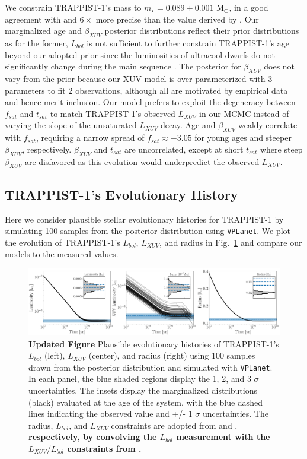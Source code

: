 \documentclass[twocolumn]{aastex62}
\newcommand{\xxx}[1]{{\textbf{#1}}}
\newcommand{\vplanet}[0]{\texttt{VPLanet}\xspace}
\begin{document}
We constrain TRAPPIST-1's mass to $m_{\star} = 0.089 \pm{0.001}$ M$_{\odot}$, in a good agreement with and $6\times$ more precise than the value derived by \citet{vanGrootel2018}. Our marginalized age and $\beta_{XUV}$ posterior distributions reflect their prior distributions as for the former, $L_{bol}$ is not sufficient to further constrain TRAPPIST-1's age beyond our adopted prior since the luminosities of ultracool dwarfs do not significantly change during the main sequence \citep{Baraffe2015}. The posterior for $\beta_{XUV}$ does not vary from the prior because our XUV model is over-parameterized with 3 parameters to fit 2 observations, although all are motivated by empirical data and hence merit inclusion. Our model prefers to exploit the degeneracy between $f_{sat}$ and $t_{sat}$ to match TRAPPIST-1's observed $L_{XUV}$ in our MCMC instead of varying the slope of the unsaturated $L_{XUV}$ decay. Age and $\beta_{XUV}$ weakly correlate with $f_{sat}$, requiring a narrow spread of $f_{sat} \approx -3.05$ for young ages and steeper $\beta_{XUV}$, respectively. $\beta_{XUV}$ and $t_{sat}$ are uncorrelated, except at short $t_{sat}$ where steep $\beta_{XUV}$ are disfavored as this evolution would underpredict the observed $L_{XUV}$.

\subsection{TRAPPIST-1's Evolutionary History}

Here we consider plausible stellar evolutionary histories for TRAPPIST-1 by simulating 100 samples from the posterior distribution using \vplanet. We plot the evolution of TRAPPIST-1's $L_{bol}$, $L_{XUV}$, and radius in Fig.~\ref{fig:evol} and compare our models to the measured values. 

\begin{figure}[t]
	\includegraphics[width=\textwidth]{../Analysis/Evol/trappist1Evol.pdf}
   \caption{\xxx{Updated Figure} Plausible evolutionary histories of TRAPPIST-1's $L_{bol}$ (left), $L_{XUV}$ (center), and radius (right) using 100 samples drawn from the posterior distribution and simulated with \vplanet. In each panel, the blue shaded regions display the 1, 2, and 3 $\sigma$ uncertainties. The insets display the marginalized distributions (black) evaluated at the age of the system, with the blue dashed lines indicating the observed value and +/- 1 $\sigma$ uncertainties. The radius, $L_{bol}$, and $L_{XUV}$ constraints are adopted from \citet{vanGrootel2018} and \citet{Wheatley2017}, \xxx{respectively, by convolving the \citet{vanGrootel2018} $L_{bol}$ measurement with the $L_{XUV}/L_{bol}$ constraints from \citet{Wheatley2017}.}}%
    \label{fig:evol}%
\end{figure}
\end{document}
